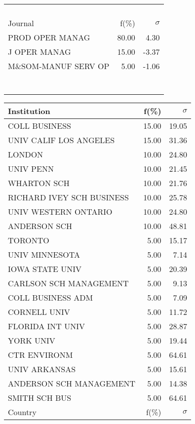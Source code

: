 \documentclass[a4paper,11pt]{report}
\begin{document}
\begin{landscape}
\begin{table}[!ht]
{\begin{tabular}{|l r  r|}
 &  & \\
 &  & \\
 &  & \\
 &  & \\
\hline
\hline
Journal & f(\%) & $\sigma$\\
\hline
PROD OPER MANAG & 80.00 & 4.30\\
J OPER MANAG & 15.00 & -3.37\\
M\&SOM-MANUF SERV OP & 5.00 & -1.06\\
 &  & \\
 &  & \\
 &  & \\
 &  & \\
 &  & \\
 &  & \\
 &  & \\
\hline
\end{tabular}
}
{\scriptsize\begin{tabular}{|l r r|}
\hline
Institution & f(\%) & $\sigma$\\
\hline
COLL BUSINESS & 15.00 & 19.05\\
UNIV CALIF LOS ANGELES & 15.00 & 31.36\\
LONDON & 10.00 & 24.80\\
UNIV PENN & 10.00 & 21.45\\
WHARTON SCH & 10.00 & 21.76\\
RICHARD IVEY SCH BUSINESS & 10.00 & 25.78\\
UNIV WESTERN ONTARIO & 10.00 & 24.80\\
ANDERSON SCH & 10.00 & 48.81\\
TORONTO & 5.00 & 15.17\\
UNIV MINNESOTA & 5.00 & 7.14\\
IOWA STATE UNIV & 5.00 & 20.39\\
CARLSON SCH MANAGEMENT & 5.00 & 9.13\\
COLL BUSINESS ADM & 5.00 & 7.09\\
CORNELL UNIV & 5.00 & 11.72\\
FLORIDA INT UNIV & 5.00 & 28.87\\
YORK UNIV & 5.00 & 19.44\\
CTR ENVIRONM & 5.00 & 64.61\\
UNIV ARKANSAS & 5.00 & 15.61\\
ANDERSON SCH MANAGEMENT & 5.00 & 14.38\\
SMITH SCH BUS & 5.00 & 64.61\\
\hline
\hline
Country & f(\%) & $\sigma$\\

\end{tabular}}
\end{table}
\end{landscape}
\end{document}
